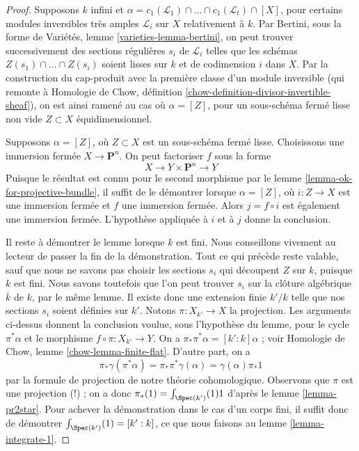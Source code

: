 \begin{proof}
\medskip\noindent
Supposons $k$ infini et $\alpha = 
c_1(\mathcal{L}_1) \cap \ldots \cap c_1(\mathcal{L}_t) \cap [X]$,
pour certains modules inversibles très amples $\mathcal{L}_i$ sur $X$ relativement à $k$.
Par Bertini, sous la forme de Variétés, lemme \ref{varieties-lemma-bertini},
on peut trouver successivement des sections régulières $s_i$ de $\mathcal{L}_i$
telles que les schémas $Z(s_1) \cap \ldots \cap Z(s_i)$
soient lisses sur $k$ et de codimension $i$ dans $X$.
Par la construction du cap-produit avec la première classe
d'un module inversible (qui remonte à
Homologie de Chow, définition \ref{chow-definition-divisor-invertible-sheaf}),
on est ainsi ramené au cas où $\alpha = [Z]$,
pour un sous-schéma fermé lisse non vide $Z \subset X$
équidimensionnel.

\medskip\noindent
Supposons $\alpha = [Z]$, où $Z \subset X$ est un sous-schéma fermé lisse.
Choisissons une immersion fermée $X \to \mathbf{P}^n$. On peut factoriser $f$ sous la forme
$$
X \to Y \times \mathbf{P}^n \to Y
$$
Puisque le résultat est connu pour le second morphisme par
le lemme \ref{lemma-ok-for-projective-bundle},
il suffit de le démontrer lorsque
$\alpha = [Z]$, où $i : Z \to X$ est une immersion fermée
et $f$ une immersion fermée.
Alors $j = f \circ i$ est également une immersion fermée.
L'hypothèse appliquée à $i$ et à $j$ donne la conclusion.

\medskip\noindent
Il reste à démontrer le lemme lorsque $k$ est fini. Nous conseillons vivement au
lecteur de passer la fin de la démonstration. Tout ce qui précède reste valable,
sauf que nous ne savons pas choisir les sections
$s_i$ qui découpent $Z$ sur $k$, puisque $k$ est fini. Nous savons toutefois
que l'on peut trouver $s_i$ sur la clôture algébrique $\overline{k}$
de $k$, par le même lemme. Il existe donc
une extension finie $k'/k$ telle que nos sections $s_i$
soient définies sur $k'$. Notons $\pi : X_{k'} \to X$ la projection.
Les arguments ci-dessus donnent la conclusion voulue,
sous l'hypothèse du lemme,
pour le cycle $\pi^*\alpha$ et le morphisme
$f \circ \pi : X_{k'} \to Y$.
On a $\pi_*\pi^*\alpha = [k' : k] \alpha$ ; voir
Homologie de Chow, lemme \ref{chow-lemma-finite-flat}.
D'autre part, on a
$$
\pi_*\gamma(\pi^*\alpha) = \pi_*\pi^*\gamma(\alpha) =
\gamma(\alpha) \pi_*1
$$
par la formule de projection de notre théorie cohomologique. Observons
que $\pi$ est une projection (!) ; on a donc
$\pi_*(1) = \int_{\Spec(k')}(1) 1$ d'après
le lemme \ref{lemma-pr2star}. Pour achever la démonstration dans
le cas d'un corps fini, il suffit donc de démontrer
$\int_{\Spec(k')}(1) = [k' : k]$, ce que nous faisons au
lemme \ref{lemma-integrate-1}.
\end{proof}

